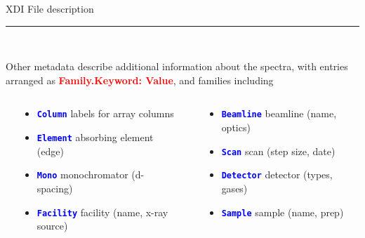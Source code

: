 \documentclass[final]{beamer}
\newcommand{\Color}[2]{{\textcolor{#1}{#2}}}
\newcommand{\BoldRed}[1]{{\Color{Red}{\bf{#1}}}}
\newcommand{\Blue}[1]{{\Color{Blue}{\bf{#1}}}}
\begin{document}
\begin{frame}{}
\begin{columns}[t]
\begin{column}{.44\linewidth}
\begin{block}{\large XDI File description}
         \vspace{3mm}

         \hrule

         \vspace{3mm} {\ }

         \justifying
         Other metadata describe additional information about the spectra, with
         entries arranged as {\BoldRed{{Family.Keyword: Value}}}, and  families including

         \begin{columns}[T]
           \begin{column}{0.02\linewidth}
           \end{column}
           \begin{column}{0.46\linewidth}
             \begin{itemize}
             \item {\Blue{\tt{Column}}}   labels for array columns
             \item {\Blue{\tt{Element}}}  absorbing element (edge)
             \item {\Blue{\tt{Mono}}}     monochromator (d-spacing)
             \item {\Blue{\tt{Facility}}} facility  (name, x-ray source)
           \end{itemize}
           \end{column}
           \begin{column}{0.02\linewidth}
           \end{column}
           \begin{column}{0.46\linewidth}
             \begin{itemize}
             \item {\Blue{\tt{Beamline}}} beamline  (name, optics)
             \item {\Blue{\tt{Scan}}}     scan  (step size, date)
             \item {\Blue{\tt{Detector}}} detector (types, gases)
             \item {\Blue{\tt{Sample}}}   sample (name, prep)
           \end{itemize}

           \end{column}
           \begin{column}{0.02\linewidth}
           \end{column}

         \end{columns}


\end{block}
\end{column}
\end{columns}
\end{frame}
\end{document}
